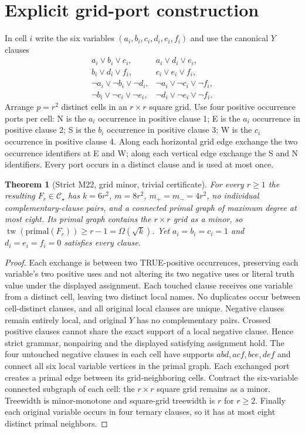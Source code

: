 \documentclass[11pt]{article}
\newtheorem{theorem}{Theorem}
\newcommand{\CS}{\mathcal C_\star}
\newcommand{\tw}{\operatorname{tw}}
\begin{document}
\section{Explicit grid-port construction}
In cell $i$ write the six variables $(a_i,b_i,c_i,d_i,e_i,f_i)$ and use the canonical $Y$ clauses
\[
\begin{array}{ll}
a_i\vee b_i\vee c_i,&a_i\vee d_i\vee e_i,\\
b_i\vee d_i\vee f_i,&c_i\vee e_i\vee f_i,\\
\neg a_i\vee\neg b_i\vee\neg d_i,&\neg a_i\vee\neg c_i\vee\neg f_i,\\
\neg b_i\vee\neg c_i\vee\neg e_i,&\neg d_i\vee\neg e_i\vee\neg f_i.
\end{array}
\]
Arrange $p=r^2$ distinct cells in an $r\times r$ square grid. Use four positive occurrence ports per cell: N is the $a_i$ occurrence in positive clause 1; E is the $a_i$ occurrence in positive clause 2; S is the $b_i$ occurrence in positive clause 3; W is the $c_i$ occurrence in positive clause 4. Along each horizontal grid edge exchange the two occurrence identifiers at E and W; along each vertical edge exchange the S and N identifiers. Every port occurs in a distinct clause and is used at most once.
\begin{theorem}[Strict M22, grid minor, trivial certificate]
For every $r\ge1$ the resulting $F_r\in\CS$ has $k=6r^2$, $m=8r^2$, $m_+=m_-=4r^2$, no individual complementary-clause pairs, and a connected primal graph of maximum degree at most eight. Its primal graph contains the $r\times r$ grid as a minor, so $\tw(\mathrm{primal}(F_r))\ge r-1=\Omega(\sqrt{k})$. Yet $a_i=b_i=c_i=1$ and $d_i=e_i=f_i=0$ satisfies every clause.
\end{theorem}
\begin{proof}
Each exchange is between two TRUE-positive occurrences, preserving each variable's two positive uses and not altering its two negative uses or literal truth value under the displayed assignment. Each touched clause receives one variable from a distinct cell, leaving two distinct local names. No duplicates occur between cell-distinct clauses, and all original local clauses are unique. Negative clauses remain entirely local, and original $Y$ has no complementary pairs. Crossed positive clauses cannot share the exact support of a local negative clause. Hence strict grammar, nonpairing and the displayed satisfying assignment hold.
The four untouched negative clauses in each cell have supports $abd,acf,bce,def$ and connect all six local variable vertices in the primal graph. Each exchanged port creates a primal edge between its grid-neighboring cells. Contract the six-variable connected subgraph of each cell: the $r\times r$ square grid remains as a minor. Treewidth is minor-monotone and square-grid treewidth is $r$ for $r\ge2$. Finally each original variable occurs in four ternary clauses, so it has at most eight distinct primal neighbors.
\end{proof}
\end{document}
